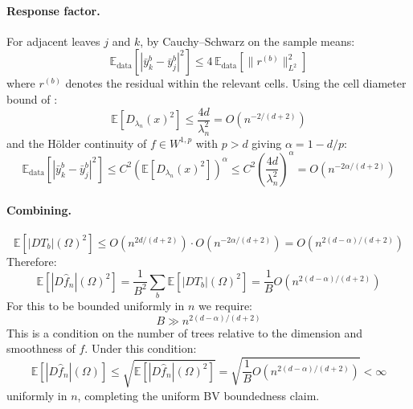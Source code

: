\documentclass[12pt]{article}
\newcommand{\E}{\mathbb{E}}
\newcommand{\fn}{\hat{f}_n}
\begin{document}
	\paragraph{Response factor.}
	For adjacent leaves $j$ and $k$, by Cauchy--Schwarz on the sample means:
	\begin{equation}
		\mathbb{E}_{\mathrm{data}}\!\left[|\bar{y}_k^b - \bar{y}_j^b|^2\right]
		\leq 4\,\mathbb{E}_{\mathrm{data}}\!\left[\|r^{(b)}\|_{L^2}^2\right]
	\end{equation}
	where $r^{(b)}$ denotes the residual within the relevant cells. Using the
	cell diameter bound of \citet{roy2009mondrian}:
	\begin{equation}
		\mathbb{E}[D_{\lambda_n}(x)^2] \leq \frac{4d}{\lambda_n^2}
		= O(n^{-2/(d+2)})
	\end{equation}
	and the Hölder continuity of $f \in W^{1,p}$ with $p > d$ giving
	$\alpha = 1 - d/p$:
	\begin{equation}
		\mathbb{E}_{\mathrm{data}}\!\left[|\bar{y}_k^b - \bar{y}_j^b|^2\right]
		\leq C^2 \left(\mathbb{E}[D_{\lambda_n}(x)^2]\right)^\alpha
		\leq C^2 \left(\frac{4d}{\lambda_n^2}\right)^\alpha
		= O(n^{-2\alpha/(d+2)})
	\end{equation}
	
	\paragraph{Combining.}
	\begin{equation}
		\E\!\left[|DT_b|(\Omega)^2\right]
		\leq O(n^{2d/(d+2)}) \cdot O(n^{-2\alpha/(d+2)})
		= O(n^{2(d-\alpha)/(d+2)})
	\end{equation}
	Therefore:
	\begin{equation}
		\E\!\left[|D\fn|(\Omega)^2\right]
		= \frac{1}{B^2} \sum_b \E\!\left[|DT_b|(\Omega)^2\right]
		= \frac{1}{B} O(n^{2(d-\alpha)/(d+2)})
	\end{equation}
	For this to be bounded uniformly in $n$ we require:
	\begin{equation}
		B \gg n^{2(d-\alpha)/(d+2)}
	\end{equation}
	This is a condition on the number of trees relative to the dimension and
	smoothness of $f$. Under this condition:
	\begin{equation}
		\E\!\left[|D\fn|(\Omega)\right]
		\leq \sqrt{\E\!\left[|D\fn|(\Omega)^2\right]}
		= \sqrt{\frac{1}{B} O(n^{2(d-\alpha)/(d+2)})}
		< \infty
	\end{equation}
	uniformly in $n$, completing the uniform BV boundedness claim.
	
\end{document}
